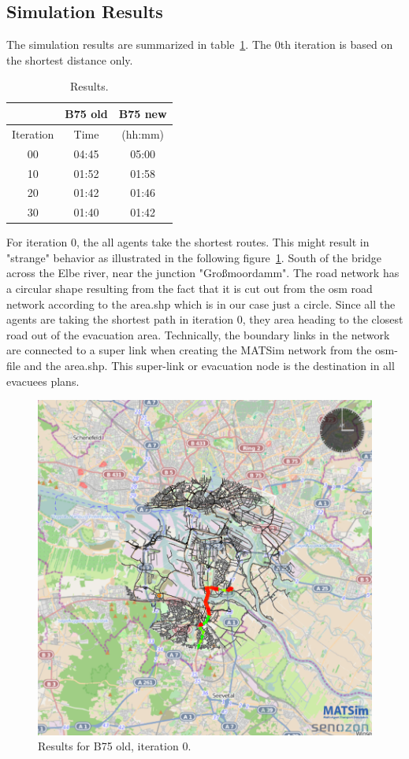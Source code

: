 \subsection{Simulation Results}

The simulation results are summarized in table~\ref{table:b75results}. The 0th iteration is based on the shortest distance only. 

\begin{table}[!ht]
	\centering
	\caption{Results.}
	\label{table:b75results}
\begin{tabular}{|c|c|c|}
	\hline \rule[-2ex]{0pt}{5.5ex}  & B75 old & B75 new \\ 
	\hline \rule[-2ex]{0pt}{5.5ex}  Iteration & Time &  (hh:mm) \\ 
	\hline \rule[-2ex]{0pt}{5.5ex}  00 & 04:45 &  05:00\\ 
	\hline \rule[-2ex]{0pt}{5.5ex}  10 & 01:52 &  01:58\\ 
	\hline \rule[-2ex]{0pt}{5.5ex}  20 & 01:42 &  01:46\\ 
	\hline \rule[-2ex]{0pt}{5.5ex}  30 & 01:40 &  01:42\\ 
	\hline 
\end{tabular} 
\end{table}

For iteration 0, the all agents take the shortest routes. This might result in "strange" behavior as illustrated in the following figure~\ref{fig:B75iteration0}.
South of the bridge across the Elbe river, near the junction "Gro{\ss}moordamm". The road network has a circular shape resulting from the fact that it is cut out from the osm road network according to the area.shp which is in our case just a circle. Since all the agents are taking the shortest path in iteration 0, they area heading to the closest road out of the evacuation area. Technically, the boundary links in the network are connected to a super link when creating the MATSim network from the osm-file and the area.shp. This super-link or evacuation node is the destination in all evacuees plans. 

\begin{figure}[th!]
\centering
\includegraphics[width=0.7\linewidth]{extending/figures/Evacuation/b75iteration0}
\caption[Results for B75 old, iteration 0.]{Results for B75 old, iteration 0.}
\label{fig:B75iteration0}
\end{figure}

